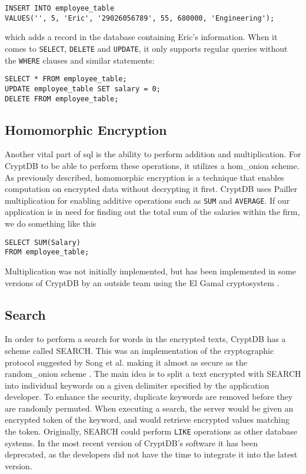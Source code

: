 \begin{verbatim}
INSERT INTO employee_table
VALUES('', 5, 'Eric', '29026056789', 55, 680000, 'Engineering');
\end{verbatim}

\noindent
which adds a record in the database containing Eric's information. When it comes to \verb!SELECT!, \verb!DELETE! and \verb!UPDATE!, it only supports regular queries without the \verb!WHERE! clauses and similar statements:

\begin{verbatim}
SELECT * FROM employee_table;
UPDATE employee_table SET salary = 0;
DELETE FROM employee_table;
\end{verbatim}



\subsection{Homomorphic Encryption}

Another vital part of \Gls{sql} is the ability to perform addition and multiplication. For CryptDB to be able to perform these operations, it utilizes a \Gls{hom_onion} scheme. As previously described, homomorphic encryption is a technique that enables computation on encrypted data without decrypting it first. CryptDB uses Pailler multiplication \cite{Paillier} for enabling additive operations such as \verb!SUM! and \verb!AVERAGE!. If our application is in need for finding out the total sum of the salaries within the firm, we do something like this

\begin{verbatim}
SELECT SUM(Salary)
FROM employee_table;
\end{verbatim}

\noindent
Multiplication was not initially implemented, but has been implemented in some versions of CryptDB by an outside team using the El Gamal cryptosystem \cite{cryptdb_guidelines}. 



\subsection{Search}

In order to perform a search for words in the encrypted texts, CryptDB has a scheme called SEARCH. This was an implementation of the cryptographic protocol suggested by Song et al. making it almost as secure as the \gls{random_onion} scheme \citep{CryptDB_Main_Paper}. The main idea is to split a text encrypted with SEARCH into individual keywords on a given delimiter specified by the application developer. To enhance the security, duplicate keywords are removed before they are randomly permuted. When executing a search, the server would be given an encrypted token of the keyword, and would retrieve encrypted values matching the token. Originally, SEARCH could perform \texttt{LIKE} operations as other database systems. In the most recent version of CryptDB's software it has been deprecated, as the developers did not have the time to integrate it into the latest version.


